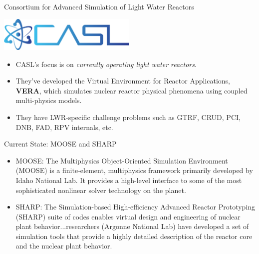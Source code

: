 \documentclass[xcolor=x11names,compress, handout]{beamer}
\renewcommand{\(}{\begin{columns}}
\renewcommand{\)}{\end{columns}}
\newcommand{\<}[1]{\begin{column}{#1}}
\renewcommand{\>}{\end{column}}
\begin{document}
\begin{frame}{Consortium for Advanced Simulation of Light Water Reactors}
\begin{center}
\includegraphics[height=0.65in,clip]{CASL}
\end{center}
\begin{itemize}
\item CASL's focus is on \textit{currently operating light water reactors}.
\item They've developed the Virtual Environment for Reactor Applications, \textbf{VERA}, which simulates nuclear reactor physical phenomena using coupled multi-physics models.
\item They have LWR-specific challenge problems such as GTRF, CRUD, PCI, DNB, FAD, RPV internals, etc. \end{itemize}
\end{frame}


\begin{frame}{Current State: MOOSE and SHARP}

\begin{itemize}
\item \textcolor{RawSienna}{MOOSE}: The Multiphysics Object-Oriented Simulation Environment (MOOSE) is a finite-element, multiphysics framework primarily developed by Idaho National Lab. It provides a high-level interface to some of the most sophisticated nonlinear solver technology on the planet.
\pause
\vspace*{1 em}
\item \textcolor{RawSienna}{SHARP}: The Simulation-based High-efficiency Advanced Reactor Prototyping (SHARP) suite of codes enables virtual design and engineering of nuclear plant behavior...researchers (Argonne National Lab) have developed a set of simulation tools that provide a highly detailed description of the reactor core and the nuclear plant behavior. 
\end{itemize}
\end{frame}
\end{document}
